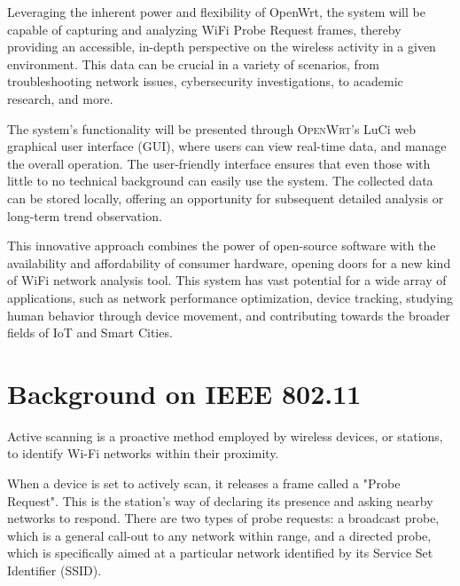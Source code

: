 \documentclass{article}
\begin{document}
Leveraging the inherent power and flexibility of OpenWrt, the system will be capable of capturing and analyzing WiFi Probe Request frames, thereby providing an accessible, in-depth perspective on the wireless activity in a given environment. This data can be crucial in a variety of scenarios, from troubleshooting network issues, cybersecurity investigations, to academic research, and more.

The system's functionality will be presented through \textsc{OpenWrt}'s LuCi web graphical user interface (GUI), where users can view real-time data, and manage the overall operation. The user-friendly interface ensures that even those with little to no technical background can easily use the system. The collected data can be stored locally, offering an opportunity for subsequent detailed analysis or long-term trend observation.

This innovative approach combines the power of open-source software with the availability and affordability of consumer hardware, opening doors for a new kind of WiFi network analysis tool. This system has vast potential for a wide array of applications, such as network performance optimization, device tracking, studying human behavior through device movement, and contributing towards the broader fields of IoT and Smart Cities.



\section{Background on IEEE 802.11}

\begin{info}
    Active scanning is a proactive method employed by wireless devices, or stations, to identify Wi-Fi networks within their proximity.
\end{info}

When a device is set to actively scan, it releases a frame called a "Probe Request". This is the station's way of declaring its presence and asking nearby networks to respond. There are two types of probe requests: a broadcast probe, which is a general call-out to any network within range, and a directed probe, which is specifically aimed at a particular network identified by its Service Set Identifier (SSID).
\end{document}

